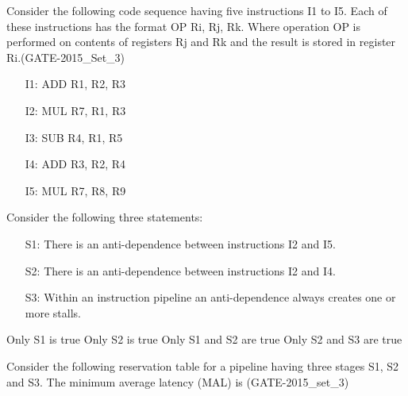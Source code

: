 \begin{questyle}
  \question  Consider the following code sequence having five instructions I1 to I5. Each of these
             instructions has the format OP Ri, Rj, Rk.  Where operation OP is performed on contents
             of registers Rj and Rk and the result is stored in register Ri.(GATE-2015\_Set\_3)
              \begin{enumerate}
                \item[I1:] ADD R1, R2, R3
                \item[I2:] MUL R7, R1, R3
                \item[I3:] SUB R4, R1, R5
                \item[I4:] ADD R3, R2, R4
                \item[I5:] MUL R7, R8, R9
              \end{enumerate}
              Consider the following three statements:
              \begin{enumerate}
                  \item[S1:] There is an anti-dependence between instructions I2 and I5.
                  \item[S2:] There is an anti-dependence between instructions I2 and I4.
                  \item[S3:] Within an instruction pipeline an anti-dependence always creates one or more stalls.
              \end{enumerate}
  \begin{choices}
    \choice         Only S1 is true
    \CorrectChoice  Only S2 is true
    \choice         Only S1 and S2 are true
    \choice         Only S2 and S3 are true
  \end{choices}
\end{questyle}


\begin{questyle}
  \question  Consider the following reservation table for a pipeline having three
             stages S1, S2 and S3. The minimum average latency (MAL) is \fillin[1]  (GATE-2015\_set\_3)
\end{questyle}



